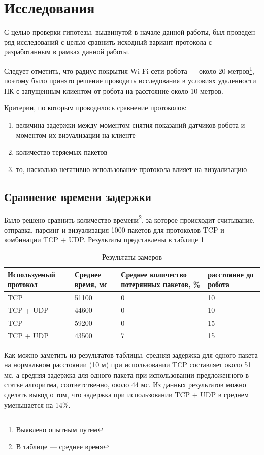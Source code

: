 \documentclass[14pt]{matmex-diploma-custom.cls}
\begin{document}
\section{Исследования}
С целью проверки гипотезы, выдвинутой в начале данной работы, был проведен ряд исследований с целью сравнить исходный вариант протокола с разработанным в рамках данной работы.

Следует отметить, что радиус покрытия Wi-Fi сети робота --- около 20 метров\footnote{Выявлено опытным путем}, поэтому было принято решение проводить исследования в условиях удаленности ПК с запущенным клиентом от робота на расстояние около 10 метров.

Критерии, по которым проводилось сравнение протоколов:
\begin{enumerate}  
\item величина задержки между моментом снятия показаний датчиков робота и моментом их визуализации на клиенте
\item количество теряемых пакетов
\item то, насколько негативно использование протокола влияет на визуализацию
\end{enumerate}

\subsection{Сравнение времени задержки}
Было решено сравнить количество времени\footnote{В таблице --- среднее время}, за которое происходит считывание, отправка, парсинг и визуализация 1000 пакетов для протоколов TCP и комбинации TCP + UDP. Результаты представлены в таблице \ref{tab:table1}
\begin{table}
\centering
  \caption{Результаты замеров}
  \label{tab:table1}
  \begin{tabular}{|p{3 cm}|p{3 cm}|p{3 cm}|p{3 cm}|}
    \hline
    Используемый протокол & Среднее время, мс & Среднее количество потерянных пакетов, \% & расстояние до робота\\
    \hline
    TCP & 51100 & 0 & 10\\
    \hline
    TCP + UDP & 44600 & 0 & 10\\
    \hline
    TCP & 59200 & 0 & 15 \\
    \hline
    TCP + UDP & 43500 & 7 & 15\\
    \hline
  \end{tabular}
\end{table}

Как можно заметить из результатов таблицы, средняя задержка для одного пакета на нормальном расстоянии (10 м) при использовании TCP составляет около 51 мс, а средняя задержка для одного пакета при использовании предложенного в статье алгоритма, соответственно, около 44 мс. Из данных результатов можно сделать вывод о том, что задержка при использовании TCP + UDP в среднем уменьшается на 14\%. 
\end{document}
